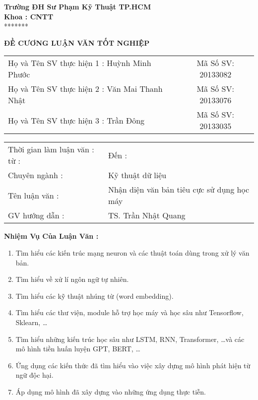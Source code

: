 
\thispagestyle{empty}
\noindent\begin{minipage}[t]{0.43\textwidth}
    \centering
    \fontsize{11pt}{16.5pt}
    \textbf{Trường ĐH Sư Phạm Kỹ Thuật TP.HCM}\\
    \textbf{Khoa : CNTT}\\
    *******
\end{minipage}

\begin{center}
    \fontsize{18pt}{27pt}
    \textbf{ĐỀ CƯƠNG LUẬN VĂN TỐT NGHIỆP}
\end{center}

\begin{table}[!h]
    \centering
    \begin{tabularx}{0.8\textwidth}{ X c }
        Họ và Tên SV thực hiện 1 : Huỳnh Minh Phước   & Mã Số SV: 20133082 \\
        Họ và Tên SV thực hiện 2 : Văn Mai Thanh Nhật & Mã Số SV: 20133076 \\
        Họ và Tên SV thực hiện 3 : Trần Đông          & Mã Số SV: 20133035 \\
    \end{tabularx}
\end{table}

\begin{center}
    \begin{tabular}{p{} p{}}
        Thời gian làm luận văn : từ : & Đến : \\
        Chuyên ngành : & Kỹ thuật dữ liệu \\
        Tên luận văn : & Nhận diện văn bản tiêu cực sử dụng học máy\\
        GV hướng dẫn : & TS. Trần Nhật Quang
    \end{tabular}
\end{center}

\textbf{Nhiệm Vụ Của Luận Văn :}
\begin{enumerate}
    \item Tìm hiểu các kiến trúc mạng neuron và các thuật toán dùng trong xử lý văn bản.
    \item Tìm hiểu về xử lí ngôn ngữ tự nhiên.
    \item Tìm hiểu các kỹ thuật nhúng từ (word embedding).
    \item Tìm hiểu các thư viện, module hỗ trợ học máy và học sâu như Tensorflow, Sklearn, \dots
    \item Tìm hiểu những kiến trúc học sâu như LSTM, RNN, Transformer, \dots và các mô hình tiền huấn luyện GPT, BERT, \dots
    \item Ứng dụng các kiến thức đã tìm hiểu vào việc xây dựng mô hình phát hiện từ ngữ độc hại.
    \item Áp dụng mô hình đã xây dựng vào những ứng dụng thực tiễn.
\end{enumerate}

